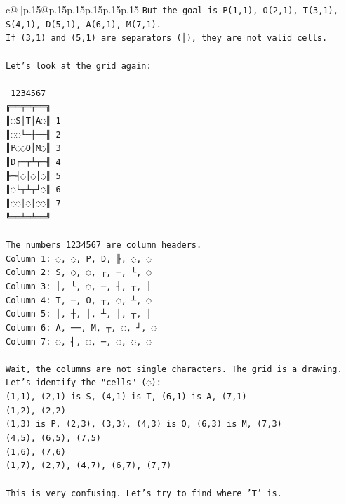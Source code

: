 \documentclass{article}
\begin{document}
{\begin{supertabular}{c@{$\;$}|p{.15\linewidth}@{}p{.15\linewidth}p{.15\linewidth}p{.15\linewidth}p{.15\linewidth}p{.15\linewidth}}
{{{\texttt{But the goal is P(1,1), O(2,1), T(3,1), S(4,1), D(5,1), A(6,1), M(7,1).} \\
\texttt{If (3,1) and (5,1) are separators (│), they are not valid cells.} \\
\\ 
\texttt{Let's look at the grid again:} \\
\\ 
\texttt{ 1234567} \\
\texttt{╔══╤═╤══╗} \\
\texttt{║◌S│T│A◌║ 1} \\
\texttt{║◌◌└─┼──╢ 2} \\
\texttt{║P◌◌O│M◌║ 3} \\
\texttt{║D┌─┬┴┬─╢ 4} \\
\texttt{╟─┤◌│◌│◌║ 5} \\
\texttt{║◌└┬┴┬┘◌║ 6} \\
\texttt{║◌◌│◌│◌◌║ 7} \\
\texttt{╚══╧═╧══╝} \\
\\ 
\texttt{The numbers 1234567 are column headers.} \\
\texttt{Column 1: ◌, ◌, P, D, ╟, ◌, ◌} \\
\texttt{Column 2: S, ◌, ◌, ┌, ─, └, ◌} \\
\texttt{Column 3: │, └, ◌, ─, ┤, ┬, │} \\
\texttt{Column 4: T, ─, O, ┬, ◌, ┴, ◌} \\
\texttt{Column 5: │, ┼, │, ┴, │, ┬, │} \\
\texttt{Column 6: A, ──, M, ┬, ◌, ┘, ◌} \\
\texttt{Column 7: ◌, ╢, ◌, ─, ◌, ◌, ◌} \\
\\ 
\texttt{Wait, the columns are not single characters. The grid is a drawing.} \\
\texttt{Let's identify the "cells" (◌):} \\
\texttt{(1,1), (2,1) is S, (4,1) is T, (6,1) is A, (7,1)} \\
\texttt{(1,2), (2,2)} \\
\texttt{(1,3) is P, (2,3), (3,3), (4,3) is O, (6,3) is M, (7,3)} \\
\texttt{(4,5), (6,5), (7,5)} \\
\texttt{(1,6), (7,6)} \\
\texttt{(1,7), (2,7), (4,7), (6,7), (7,7)} \\
\\ 
\texttt{This is very confusing. Let's try to find where 'T' is.} \\
}}}
\end{supertabular}}
\end{document}
